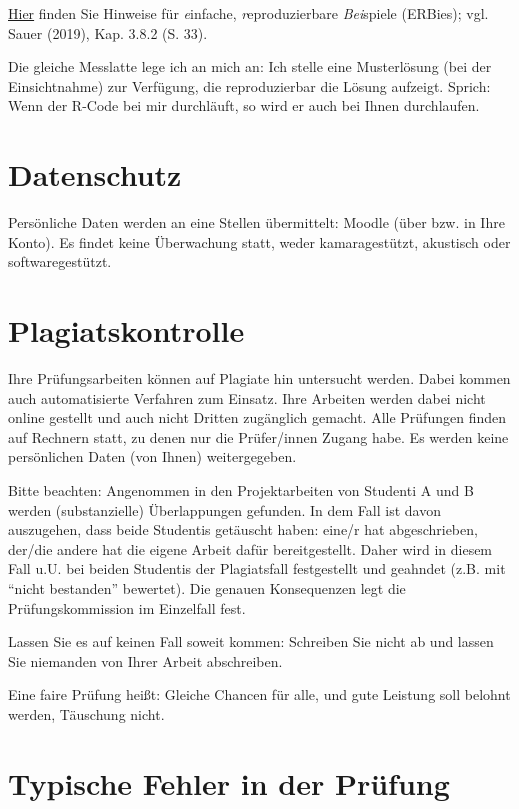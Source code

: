 \documentclass[
  a4paper,
  DIV=11]{scrreprt}
\theoremstyle{definition}
\theoremstyle{remark}
\begin{document}
\href{https://data-se.netlify.app/2022/01/31/erbie-einfache-reproduzierbare-beispiele-ihres-problems-mit-r-syntax/}{Hier}
finden Sie Hinweise für \emph{e}infache, \emph{r}eproduzierbare
\emph{Bei}spiele (ERBies); vgl. Sauer (2019), Kap. 3.8.2 (S. 33).

Die gleiche Messlatte lege ich an mich an: Ich stelle eine Musterlösung
(bei der Einsichtnahme) zur Verfügung, die reproduzierbar die Lösung
aufzeigt. Sprich: Wenn der R-Code bei mir durchläuft, so wird er auch
bei Ihnen durchlaufen.

\hypertarget{datenschutz}{%
\section{Datenschutz}\label{datenschutz}}

Persönliche Daten werden an eine Stellen übermittelt: Moodle (über bzw.
in Ihre Konto). Es findet keine Überwachung statt, weder kamaragestützt,
akustisch oder softwaregestützt.

\hypertarget{plagiatskontrolle}{%
\section{Plagiatskontrolle}\label{plagiatskontrolle}}

Ihre Prüfungsarbeiten können auf Plagiate hin untersucht werden. Dabei
kommen auch automatisierte Verfahren zum Einsatz. Ihre Arbeiten werden
dabei nicht online gestellt und auch nicht Dritten zugänglich gemacht.
Alle Prüfungen finden auf Rechnern statt, zu denen nur die Prüfer/innen
Zugang habe. Es werden keine persönlichen Daten (von Ihnen)
weitergegeben.

Bitte beachten: Angenommen in den Projektarbeiten von Studenti A und B
werden (substanzielle) Überlappungen gefunden. In dem Fall ist davon
auszugehen, dass beide Studentis getäuscht haben: eine/r hat
abgeschrieben, der/die andere hat die eigene Arbeit dafür
bereitgestellt. Daher wird in diesem Fall u.U. bei beiden Studentis der
Plagiatsfall festgestellt und geahndet (z.B. mit ``nicht bestanden''
bewertet). Die genauen Konsequenzen legt die Prüfungskommission im
Einzelfall fest.

Lassen Sie es auf keinen Fall soweit kommen: Schreiben Sie nicht ab und
lassen Sie niemanden von Ihrer Arbeit abschreiben.

Eine faire Prüfung heißt: Gleiche Chancen für alle, und gute Leistung
soll belohnt werden, Täuschung nicht.

\hypertarget{typische-fehler-in-der-pruxfcfung}{%
\section{Typische Fehler in der
Prüfung}\label{typische-fehler-in-der-pruxfcfung}}
\end{document}
